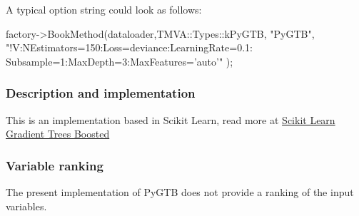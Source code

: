 
A typical option string could look as follows:
\begin{codeexample}
\begin{tmvacode}
factory->BookMethod(dataloader,TMVA::Types::kPyGTB, "PyGTB",
"!V:NEstimators=150:Loss=deviance:LearningRate=0.1:
Subsample=1:MaxDepth=3:MaxFeatures='auto'" );
\end{tmvacode}
\label{ce:PyGTBexample}
\end{codeexample}

\subsubsection{Description and implementation}
This is an implementation based in Scikit Learn,
read more at \href{http://scikit-learn.org/stable/modules/ensemble.html#gradient-boosting}{Scikit Learn Gradient Trees Boosted}

\subsubsection{Variable ranking}

The present implementation of PyGTB does not provide a ranking 
of the input variables.

% 

